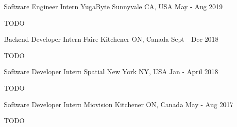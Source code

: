 
\begin{cventries}
\cventry
    {Software Engineer Intern}
    {YugaByte}
    {Sunnyvale CA, USA}
    {May - Aug 2019}
    {
      \begin{cvitems}
      	\item TODO
      \end{cvitems}
    }

\cventry
    {Backend Developer Intern}
    {Faire}
    {Kitchener ON, Canada}
    {Sept - Dec 2018}
    {
      \begin{cvitems}
      	\item TODO
      \end{cvitems}
    }
    
\cventry
    {Software Developer Intern}
    {Spatial}
    {New York NY, USA}
    {Jan - April 2018}
    {
      \begin{cvitems}
      	\item TODO
      \end{cvitems}
    }
    
\cventry
    {Software Developer Intern}
    {Miovision}
    {Kitchener ON, Canada}
    {May - Aug 2017}
    {
      \begin{cvitems}
      	\item TODO
      \end{cvitems}
    }

\end{cventries}
